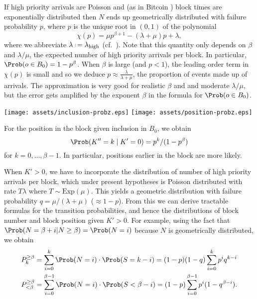 \documentclass[a4paper,11pt]{article}
\begin{document}
\begin{example}
\label{exponential-block-time}

  If high priority arrivals are Poisson and (as in Bitcoin \cite{kasahara2019effect}) block times are exponentially distributed then $N$ ends up geometrically distributed with failure probability $p$, where $p$ is the unique root in $(0,1)$ of the polynomial
  \[
    \chi(p) = \mu p^{\beta+1} - (\lambda + \mu)p + \lambda,
  \]
  where we abbreviate $\lambda\defeq\lambda_\mathrm{high}$ (cf.~\cite[\S3.2]{gross2018fundamentals}).
  Note that this quantity only depends on $\beta$ and $\lambda/\mu$, the expected number of high priority arrivals per block.
  In particular, $\Prob(o\in B_0) = 1-p^{\beta}$.
  When $\beta$ is large (and $p<1$), the leading order term in $\chi(p)$ is small and so we deduce $p\approx \frac{\lambda}{\lambda+\mu}$, the proportion of events made up of arrivals.
  The approximation is very good for realistic $\beta$ and and moderate $\lambda/\mu$, but the error gets amplified by the exponent $\beta$ in the formula for $\Prob(o\in B_0)$.
  \begin{center}
    \texttt{[image: assets/inclusion-probz.eps]}
    \texttt{[image: assets/position-probz.eps]}
  \end{center}    
  For the position in the block given inclusion in $B_0$, we obtain
  \[
    \Prob(K''=k \mid K'=0 ) = p^k / (1-p^\beta)
  \]
  for $k=0,\ldots,\beta-1$. In particular, positions earlier in the block are more likely.
  
  When $K'>0$, we have to incorporate the distribution of number of high priority arrivals per block, which under present hypotheses is Poisson distributed with rate $T\lambda$ where $T\sim\mathrm{Exp}(\mu)$.
  This yields a geometric distribution with failure probability $q=\mu/(\lambda+\mu)$ ($\approx 1-p$).
  From this we can derive tractable formulas for the transition probabilities, and hence the distributions of block number and block position given $K'>0$. 
  For example, using the fact that $\Prob(N=\beta+i|N\geq\beta)= \Prob(N=i)$ because $N$ is geometrically distributed, we obtain
  \begin{align}
    P^{\geq\beta}_k &= \sum_{i=0}^{k}\Prob(N=i)\cdot \Prob(S=k-i) = (1-p)(1-q)\sum_{i=0}^{k}p^iq^{k-i} \\
    P^{\geq\beta}_{<\beta} &= \sum_{i=0}^{\beta-1}\Prob(N=i)\cdot \Prob(S<\beta-i) = (1-p)\sum_{i=0}^{\beta-1}p^i(1-q^{\beta-i}).
  \end{align}
  
\end{example}
\end{document}
